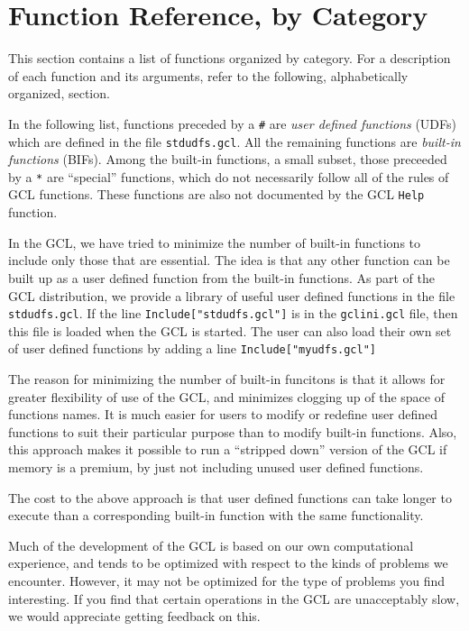 %
%
%

\chapter{Function Reference, by Category}

This section contains a list of functions organized by
category.  For a description of each function and its arguments,
refer to the following, alphabetically organized, section.  

In the following list, functions preceded by a \verb+#+ are {\it user
defined functions} (UDFs) which are defined in the file
\verb+stdudfs.gcl+.  All the remaining functions are {\it built-in
functions} (BIFs).  Among the built-in functions, a small subset,
those preceeded by a \verb+*+ are ``special'' functions, which do not
necessarily follow all of the rules of GCL functions.  These functions
are also not documented by the GCL \verb+Help+ function.  

In the GCL, we have tried to minimize the number of built-in functions
to include only those that are essential.  The idea is that any other
function can be built up as a user defined function from the built-in
functions.  As part of the GCL distribution, we provide a library of
useful user defined functions in the file \verb+stdudfs.gcl+.  If the
line \verb+Include["stdudfs.gcl"]+ is in the \verb+gclini.gcl+ file,
then this file is loaded when the GCL is started.  The user can also
load their own set of user defined functions by adding a line
\verb+Include["myudfs.gcl"]+

The reason for minimizing the number of built-in funcitons is that it
allows for greater flexibility of use of the GCL, and minimizes
clogging up of the space of functions names.  It is much easier for
users to modify or redefine user defined functions to suit their
particular purpose than to modify built-in functions.  Also, this
approach makes it possible to run a ``stripped down'' version of the
GCL if memory is a premium, by just not including unused user defined
functions.

The cost to the above approach is that user defined functions can take
longer to execute than a corresponding built-in function with the same
functionality.

Much of the development of the GCL is based on our own computational
experience, and tends to be optimized with respect to the kinds of
problems we encounter.  However, it may not be optimized
for the type of problems you find interesting.  If you find that
certain operations in the GCL are unacceptably slow, we would
appreciate getting feedback on this.

